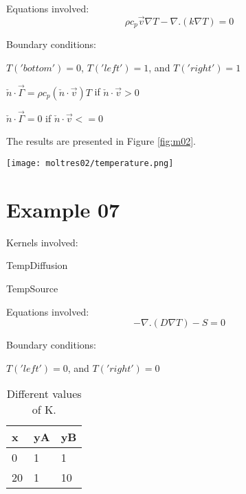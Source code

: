 \documentclass[11pt,letterpaper]{article}
\begin{document}
Equations involved:
\begin{equation}
\rho c_{p}\vec{v}\nabla T-\nabla.(k\nabla T)=0
\end{equation}

Boundary conditions:
\begin{description}[]
	\item[] $T('bottom')=0$, $T('left')=1$, and $T('right')=1$
	\item[] $\check{n}\cdot\vec{\Gamma}=\rho c_{p}(\check{n}\cdot\vec{v})T$ if $\check{n}\cdot\vec{v}>0$
	\item[] $\check{n}\cdot\vec{\Gamma}=0$ if $\check{n}\cdot\vec{v}<=0$
\end{description}

The results are presented in Figure \ref{fig:m02}.
\begin{figure*}[!h]
	\centering
	\texttt{[image: moltres02/temperature.png]} 
	\hfill
	\caption{Temperature.}
	\label{fig:m02}
\end{figure*}

\newpage
\section{Example 07}

Kernels involved:
\begin{description}[font=$\bullet$\scshape\bfseries]
	\item[] TempDiffusion
	\item[] TempSource
\end{description}

Equations involved:
\begin{equation}
-\nabla.(D\nabla T)-S=0
\end{equation}

Boundary conditions:
\begin{description}[]
	\item[] $T('left')=0$, and $T('right')=0$
\end{description}

\begin{table}[]
	\centering
	\caption{Different values of K.}
	\begin{tabular}{|l|l|l|}
		\hline
		x  & \multicolumn{1}{c|}{yA} & yB \\ \hline
		0  & 1                       & 1  \\ \hline
		20 & 1                       & 10 \\ \hline
	\end{tabular}
	\label{tab:ex07}
\end{table}
\end{document}
